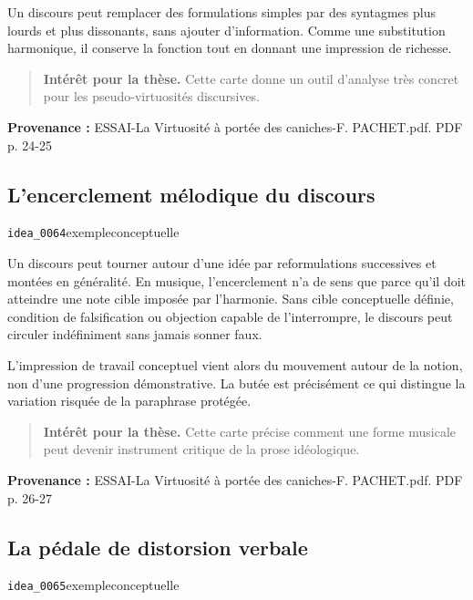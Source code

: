 \documentclass[10pt,a4paper]{article}
\begin{document}
Un discours peut remplacer des formulations simples par des syntagmes plus lourds et plus dissonants, sans ajouter d'information. Comme une substitution harmonique, il conserve la fonction tout en donnant une impression de richesse.

\begin{quote}
\textbf{Intérêt pour la thèse.} Cette carte donne un outil d'analyse très concret pour les pseudo-virtuosités discursives.
\end{quote}
{\footnotesize\color{metadata}\textbf{Provenance :} ESSAI-La Virtuosité à portée des caniches-F. PACHET.pdf. PDF p. 24-25\par}

\subsection{L'encerclement mélodique du discours}
{\small\color{metadata} \texttt{idea\_0064}\quad\textbullet\quad exemple\quad\textbullet\quad conceptuelle\par}

Un discours peut tourner autour d'une idée par reformulations successives et montées en généralité. En musique, l'encerclement n'a de sens que parce qu'il doit atteindre une note cible imposée par l'harmonie. Sans cible conceptuelle définie, condition de falsification ou objection capable de l'interrompre, le discours peut circuler indéfiniment sans jamais sonner faux.

L'impression de travail conceptuel vient alors du mouvement autour de la notion, non d'une progression démonstrative. La butée est précisément ce qui distingue la variation risquée de la paraphrase protégée.

\begin{quote}
\textbf{Intérêt pour la thèse.} Cette carte précise comment une forme musicale peut devenir instrument critique de la prose idéologique.
\end{quote}
{\footnotesize\color{metadata}\textbf{Provenance :} ESSAI-La Virtuosité à portée des caniches-F. PACHET.pdf. PDF p. 26-27\par}

\subsection{La pédale de distorsion verbale}
{\small\color{metadata} \texttt{idea\_0065}\quad\textbullet\quad exemple\quad\textbullet\quad conceptuelle\par}
\end{document}
